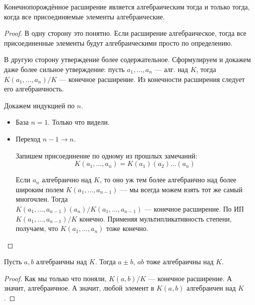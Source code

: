 \follow Конечнопорождённое расширение является алгебраическим тогда и только тогда, когда все присоединяемые элементы алгебраические.
\begin{proof}
    В одну сторону это понятно. Если расширение алгебраическое, тогда все присоединенные элементы будут алгебраическими просто по определению.

    В другую сторону утверждение более содержательное. Сформулируем и докажем даже более сильное утверждение: пусть $a_1, \dots, a_n$ --- алг. над $K$, тогда $K(a_1, \dots, a_n)/K$ --- конечное расширение. Из конечности расширения следует его алгебраичность.

    Докажем индукцией по $n$.
    \begin{itemize}
        \item База $n = 1$. Только что видели.
        \item Переход $n - 1 \to n$.
        
        Запишем присоединение по одному из прошлых замечаний:
        $$ K(a_1, \dots, a_n) = K(a_1)(a_2)\dots(a_n) $$

        Если $a_n$ алгебраично над $K$, то оно уж тем более алгебраично над более широким полем $K(a_1, \dots, a_{n-1})$ --- мы всегда можем взять тот же самый многочлен. Тогда \\$K(a_1, \dots, a_{n-1})(a_n) / K(a_1, \dots, a_{n-1})$ --- конечное расширение. По ИП $K(a_1, \dots, a_{n-1}) / K$ конечно. Применяя мультипликативность степени, получаем, что $K(a_1, \dots, a_n)$ тоже конечно.
    \end{itemize}
\end{proof}

\follow Пусть $a, b$ алгебраичны над $K$. Тогда $a \pm b$, $ab$ тоже алгебраичны над $K$.
\begin{proof}
    Как мы только что поняли, $K(a, b) / K$ --- конечное расширение. А значит, алгебраичное. А значит, любой элемент в $K(a, b)$ алгебраичен над $K$.
\end{proof}



